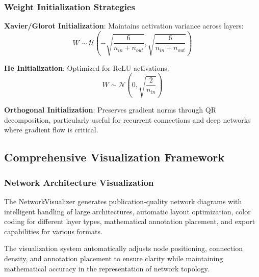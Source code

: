 \documentclass[11pt,a4paper]{report}
\begin{document}
\subsubsection{Weight Initialization Strategies}

\textbf{Xavier/Glorot Initialization}: Maintains activation variance across layers:
\begin{equation}
W \sim \mathcal{U}\left(-\sqrt{\frac{6}{n_{in} + n_{out}}}, \sqrt{\frac{6}{n_{in} + n_{out}}}\right)
\end{equation}

\textbf{He Initialization}: Optimized for ReLU activations:
\begin{equation}
W \sim \mathcal{N}\left(0, \sqrt{\frac{2}{n_{in}}}\right)
\end{equation}

\textbf{Orthogonal Initialization}: Preserves gradient norms through QR decomposition, particularly useful for recurrent connections and deep networks where gradient flow is critical.

\subsection{Comprehensive Visualization Framework}

\subsubsection{Network Architecture Visualization}

The NetworkVisualizer generates publication-quality network diagrams with intelligent handling of large architectures, automatic layout optimization, color coding for different layer types, mathematical annotation placement, and export capabilities for various formats.

The visualization system automatically adjusts node positioning, connection density, and annotation placement to ensure clarity while maintaining mathematical accuracy in the representation of network topology.
\end{document}

